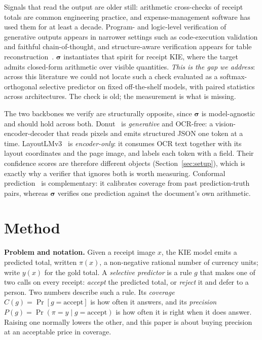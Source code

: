 \documentclass[conference]{IEEEtran}
\let\IEEEsigma\sigma
\DeclareRobustCommand{\sigma}{{\boldsymbol{\IEEEsigma}}}
\begin{document}
\noindent Signals that read the output are older still: arithmetic
cross-checks of receipt totals are common engineering practice, and expense-management
software has used them for at least a decade. Program- and logic-level
verification of generative outputs appears in narrower settings such as
code-execution validation and faithful chain-of-thought, and structure-aware
verification appears for table reconstruction~\cite{nassar2022tableformer}.
$\sigma$ instantiates that spirit for receipt KIE, where the target admits
closed-form arithmetic over visible quantities. \emph{This is the gap we
address}: across this literature we could not locate such a check evaluated as
a softmax-orthogonal selective predictor on fixed off-the-shelf models, with
paired statistics across architectures. The check is old; the measurement is
what is missing.

\noindent The two backbones we verify are structurally opposite, since
$\sigma$ is model-agnostic and should hold across both.
Donut~\cite{kim2022donut} is \emph{generative} and OCR-free: a
vision-encoder-decoder that reads pixels and emits structured JSON one token
at a time. LayoutLMv3~\cite{huang2022layoutlmv3} is \emph{encoder-only}: it
consumes OCR text together with its layout coordinates and the page image, and
labels each token with a field. Their confidence scores are therefore
different objects (Section~\ref{sec:setup}), which is exactly why a verifier
that ignores both is worth measuring. Conformal
prediction~\cite{angelopoulos2021gentle} is complementary: it calibrates coverage from past prediction-truth pairs, whereas
$\sigma$ verifies one prediction against the document's own arithmetic.

\section{Method}
\label{sec:method}

\noindent\textbf{Problem and notation.} Given a receipt image $x$, the KIE model emits a predicted
total, written $\pi(x)$, a non-negative rational number of currency
units; write $y(x)$ for the gold total. A \emph{selective predictor} is a rule
$g$ that makes one of two calls on every receipt: \emph{accept} the predicted
total, or \emph{reject} it and defer to a person. Two numbers describe such a
rule. Its \emph{coverage} $C(g)=\Pr[g{=}\text{accept}]$ is how often it
answers, and its \emph{precision}
$P(g)=\Pr(\pi{=}y\mid g{=}\text{accept})$ is how often it is right when it
does answer. Raising one normally lowers the other, and this paper is about
buying precision at an acceptable price in coverage.
\end{document}
